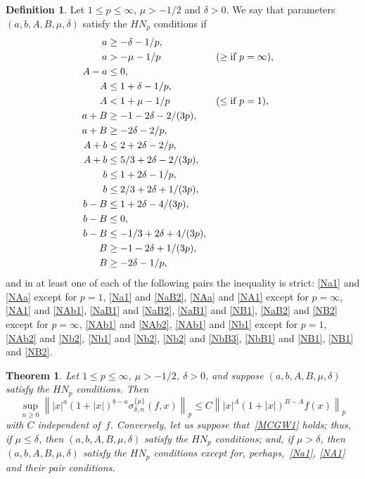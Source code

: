 \documentclass{amsart}
\theoremstyle{plain}
\newtheorem{Theo}{Theorem}
\theoremstyle{definition}
\newtheorem{Def}{Definition}
\theoremstyle{remark}
\newcommand{\chem}[3]{\sigma_{#1,#2}^{\{#3\}}} %
\newcommand{\I}{\infty}
\begin{document}
\begin{Def}
\label{DNp} Let $1\le p\le\infty$, $\mu>-1/2$ and $\delta>0$. We say that parameters
$(a,b,A,B,\mu,\delta)$ satisfy the $H\!N_p$ conditions if
\begin{align}
\label{Na1} a &\ge -\delta-1/p,\\
\label{Na2} a &> -\mu-1/p && (\ge \textup{if } p=\infty),\\
\label{NAa} A-a &\le 0,\\
\label{NA1} A &\le 1+\delta-1/p,\\
\label{NA2} A &< 1+\mu-1/p && (\le \textup{if } p=1),\\
\label{NaB1} a+B &\ge -1-2\delta-2/(3p),\\
\label{NaB2} a+B &\ge -2\delta-2/p,\\
\label{NAb1} A+b &\le 2+2\delta-2/p,\\
\label{NAb2} A+b &\le 5/3+2\delta-2/(3p),\\
\label{Nb1} b &\le 1+2\delta-1/p,\\
\label{Nb2} b &\le 2/3+2\delta+1/(3p),\\
\label{NbB1} b-B &\le 1+2\delta-4/(3p),\\
\label{NbB2} b-B &\le 0,\\
\label{NbB3} b-B &\le -1/3+2\delta+4/(3p),\\
\label{NB1} B &\ge -1-2\delta+1/(3p),\\
\label{NB2} B &\ge -2\delta-1/p,
\end{align}
and in at least one of each of the following pairs
the inequality is strict:
\eqref{Na1} and \eqref{NAa} except for $p=1$,
\eqref{Na1} and \eqref{NaB2},
\eqref{NAa} and \eqref{NA1} except for $p=\I$,
\eqref{NA1} and \eqref{NAb1},
\eqref{NaB1} and \eqref{NaB2},
\eqref{NaB1} and \eqref{NB1},
\eqref{NaB2} and \eqref{NB2} except for $p=\I$,
\eqref{NAb1} and \eqref{NAb2},
\eqref{NAb1} and \eqref{Nb1} except for $p=1$,
\eqref{NAb2} and \eqref{Nb2},
\eqref{Nb1} and \eqref{Nb2},
\eqref{Nb2} and \eqref{NbB3},
\eqref{NbB1} and \eqref{NB1},
\eqref{NB1} and \eqref{NB2}.
\end{Def}

\begin{Theo}
\label{MCGWT1}
Let $1\le p\le\infty$, $\mu>-1/2$, $\delta>0$, and suppose $(a,b,A,B,\mu,\delta)$
satisfy the $H\!N_{p}$ conditions. Then
\begin{equation}
\label{MCGW1}
  \sup_{n\ge0} \left\| |x|^a(1+|x|)^{b-a}\chem{\delta}{n}{\mu}(f,x) \right\|_p
  \le C \left\| |x|^A(1+|x|)^{B-A}f(x) \right\|_p
\end{equation}
with $C$ independent of~$f$.
Conversely, let us suppose that~\eqref{MCGW1} holds; thus, if $\mu\le \delta$, then
$(a,b,A,B,\mu,\delta)$ satisfy the $H\!N_p$ conditions; and, if $\mu>\delta$, then
$(a,b,A,B,\mu,\delta)$ satisfy the $H\!N_p$ conditions except for, perhaps,~\eqref{Na1},
\eqref{NA1} and their pair conditions.
\end{Theo}
\end{document}
